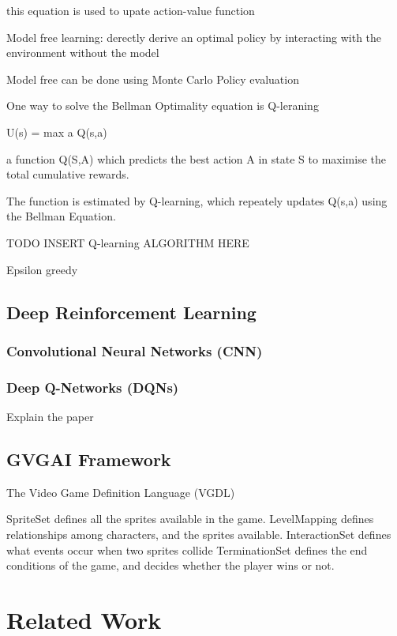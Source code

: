 \documentclass[12pt,twoside]{report}
\begin{document}
this equation is used to upate action-value function

Model free learning: derectly derive an optimal policy by interacting with the environment without the model

Model free can be done using Monte Carlo Policy evaluation

One way to solve the Bellman Optimality equation is Q-leraning

U(s) = max a Q(s,a)


a function Q(S,A) which predicts the best action A in state S to maximise the total cumulative rewards.

The function is estimated by Q-learning, which repeately updates Q(s,a) using
the Bellman Equation.

TODO INSERT Q-learning ALGORITHM HERE


Epsilon greedy

\section{Deep Reinforcement Learning}
\label{drl}

\subsection{Convolutional Neural Networks (CNN)}
\label{cnn}

\subsection{Deep Q-Networks (DQNs)}
\label{dqn}

Explain the paper
\section{GVGAI Framework}
\label{gvgai}

The Video Game Definition Language (VGDL)

SpriteSet defines all the sprites available in the game.
LevelMapping defines relationships among characters, and the sprites available.
InteractionSet defines what events occur when two sprites collide
TerminationSet defines the end conditions of the game, and decides whether the player wins or not.


\chapter{Related Work}
\end{document}
